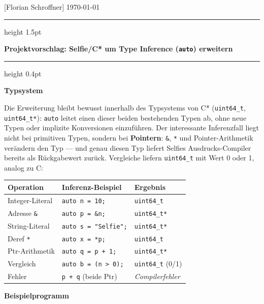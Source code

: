 \documentclass[a4paper,10pt]{article}
\begin{document}
{\small [Florian Schroffner] \hfill \today}

\vspace{0.2cm}
\hrule height 1.5pt
\vspace{0.15cm}

{\large \textbf{\textcolor{headcolor}{Projektvorschlag: Selfie/C* um Type Inference (\texttt{auto}) erweitern}}}\\

\vspace{0.15cm}
\hrule height 0.4pt
\vspace{0.2cm}

\textbf{Typsystem}

Die Erweiterung bleibt bewusst innerhalb des Typsystems von C* (\texttt{uint64\_t}, \texttt{uint64\_t*}): \texttt{auto} leitet einen dieser beiden bestehenden Typen ab, ohne neue Typen oder implizite Konversionen einzuführen. Der interessante Inferenzfall liegt nicht bei primitiven Typen, sondern bei \textbf{Pointern}: \texttt{\&}, \texttt{*} und Pointer-Arithmetik verändern den Typ --- und genau diesen Typ liefert Selfies Ausdrucks-Compiler bereits als Rückgabewert zurück. Vergleiche liefern \texttt{uint64\_t} mit Wert 0 oder 1, analog zu C:

\vspace{1pt}
\begin{center}
\small
\begin{tabular}{lll}
\toprule
\textbf{Operation} & \textbf{Inferenz-Beispiel} & \textbf{Ergebnis} \\
\midrule
Integer-Literal & \texttt{auto n = 10;}      & \texttt{uint64\_t}  \\
Adresse \texttt{\&} & \texttt{auto p = \&n;}  & \texttt{uint64\_t*} \\
String-Literal  & \texttt{auto s = "Selfie";} & \texttt{uint64\_t*} \\
Deref \texttt{*} & \texttt{auto x = *p;}     & \texttt{uint64\_t}  \\
Ptr-Arithmetik  & \texttt{auto q = p + 1;}   & \texttt{uint64\_t*} \\
Vergleich       & \texttt{auto b = (n > 0);} & \texttt{uint64\_t} (0/1) \\
Fehler          & \texttt{p + q} (beide Ptr) & \textit{Compilerfehler} \\
\bottomrule
\end{tabular}
\end{center}
\vspace{1pt}

\textbf{Beispielprogramm}
\end{document}
